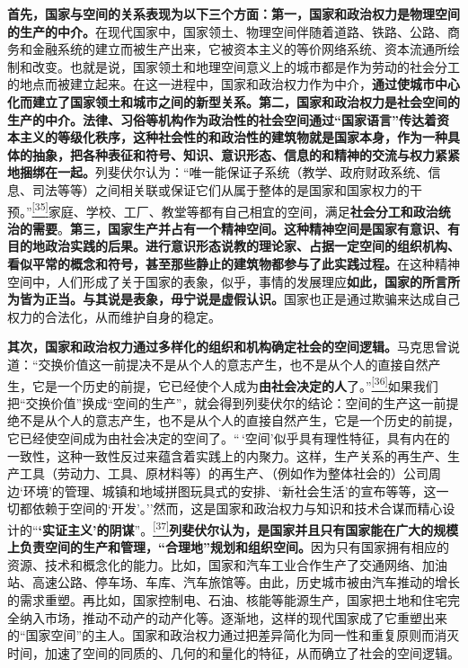 \documentclass[UTF8, fontset = sourcesans, a4paper, oneside, zihao =
-4, scheme=chinese, no-math, space=true]{ctexbook}
\begin{document}
\textbf{首先，国家与空间的关系表现为以下三个方面：第一，国家和政治权力是物理空间的生产的中介。}在现代国家中，国家领土、物理空间伴随着道路、铁路、公路、商务和金融系统的建立而被生产出来，它被资本主义的等价网络系统、资本流通所绘制和改变。也就是说，国家领土和地理空间意义上的城市都是作为劳动的社会分工的地点而被建立起来。在这一进程中，国家和政治权力作为中介，\textbf{通过使城市中心化而建立了国家领土和城市之间的新型关系。第二，国家和政治权力是社会空间的生产的中介。法律、习俗等机构作为政治性的社会空间通过``国家语言''传达着资本主义的等级化秩序，这种社会性的和政治性的建筑物就是国家本身，作为一种具体的抽象，把各种表征和符号、知识、意识形态、信息的和精神的交流与权力紧紧地捆绑在一起。}列斐伏尔认为：``唯一能保证子系统（教学、政府财政系统、信息、司法等等）之间相关联或保证它们从属于整体的是国家和国家权力的干预。''\protect\hypertarget{part0007_split_002.htmlux5cux23w35}{}{}\protect\hyperlink{part0007_split_004.htmlux5cux23m35}{\textsuperscript{{[}35{]}}}家庭、学校、工厂、教堂等都有自己相宜的空间，满足\textbf{社会分工和政治统治的需要}。\textbf{第三，国家生产并占有一个精神空间。这种精神空间是国家有意识、有目的地政治实践的后果。进行意识形态说教的理论家、占据一定空间的组织机构、看似平常的概念和符号，甚至那些静止的建筑物都参与了此实践过程。}在这种精神空间中，人们形成了关于国家的表象，似乎，事情的发展理应\textbf{如此，国家的所言所为皆为正当。与其说是表象，毋宁说是虚假认识。}国家也正是通过欺骗来达成自己权力的合法化，从而维护自身的稳定。

\textbf{其次，国家和政治权力通过多样化的组织和机构确定社会的空间逻辑。}马克思曾说道：``交换价值这一前提决不是从个人的意志产生，也不是从个人的直接自然产生，它是一个历史的前提，它已经使个人成为\textbf{由社会决定的人}了。''\protect\hypertarget{part0007_split_002.htmlux5cux23w36}{}{}\protect\hyperlink{part0007_split_004.htmlux5cux23m36}{\textsuperscript{{[}36{]}}}如果我们把``交换价值''换成``空间的生产''，就会得到列斐伏尔的结论：空间的生产这一前提绝不是从个人的意志产生，也不是从个人的直接自然产生，它是一个历史的前提，它已经使空间成为由社会决定的空间了。``\,`空间'似乎具有理性特征，具有内在的一致性，这种一致性反过来蕴含着实践上的内聚力。这样，生产关系的再生产、生产工具（劳动力、工具、原材料等）的再生产、（例如作为整体社会的）公司周边`环境'的管理、城镇和地域拼图玩具式的安排、`新社会生活'的宣布等等，这一切都依赖于空间的`开发'。''然而，这是国家和政治权力与知识和技术合谋而精心设计的``\textbf{`实证主义'的阴谋}''。\protect\hypertarget{part0007_split_002.htmlux5cux23w37}{}{}\protect\hyperlink{part0007_split_004.htmlux5cux23m37}{\textsuperscript{{[}37{]}}}\textbf{列斐伏尔认为，是国家并且只有国家能在广大的规模上负责空间的生产和管理，``合理地''规划和组织空间。}因为只有国家拥有相应的资源、技术和概念化的能力。比如，国家和汽车工业合作生产了交通网络、加油站、高速公路、停车场、车库、汽车旅馆等。由此，历史城市被由汽车推动的增长的需求重塑。再比如，国家控制电、石油、核能等能源生产，国家把土地和住宅完全纳入市场，推动不动产的动产化等。逐渐地，这样的现代国家成了它重塑出来的``国家空间''的主人。国家和政治权力通过把差异简化为同一性和重复原则而消灭时间，加速了空间的同质的、几何的和量化的特征，从而确立了社会的空间逻辑。
\end{document}
